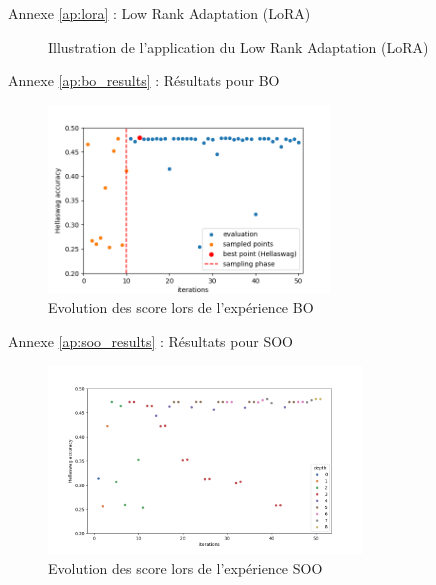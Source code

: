 \begin{frame}{Annexe \ref{ap:lora} : Low Rank Adaptation (LoRA)}
    \label{ap:lora}
    \begin{figure}
        \centering
        
        \caption{Illustration de l'application du Low Rank Adaptation (LoRA)}
    \end{figure}
    
\end{frame}


\begin{frame}{Annexe \ref{ap:bo_results} : Résultats pour BO}
    \label{ap:bo_results}
    \begin{figure}
        \centering
        \includegraphics[height = 5cm]{assets/imgs/plots/bo/score_evolution.png}
        \caption{Evolution des score lors de l'expérience BO}
    \end{figure}
\end{frame}

\begin{frame}{Annexe \ref{ap:soo_results} : Résultats pour SOO}
    \label{ap:soo_results}
    \begin{figure}
        \centering
        \includegraphics[height = 5cm]{assets/imgs/plots/soo/score_evolution.png}
        \caption{Evolution des score lors de l'expérience SOO}
    \end{figure} 
\end{frame}

